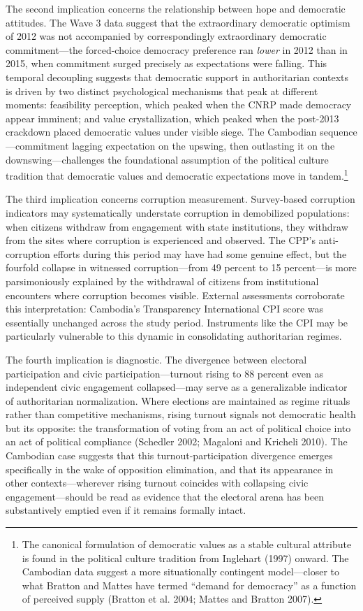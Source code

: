 \documentclass[Review,times,sageh,doublespace]{sagej}
\begin{document}
The second implication concerns the relationship between hope and
democratic attitudes. The Wave 3 data suggest that the extraordinary
democratic optimism of 2012 was not accompanied by correspondingly
extraordinary democratic commitment---the forced-choice democracy
preference ran \emph{lower} in 2012 than in 2015, when commitment surged
precisely as expectations were falling. This temporal decoupling
suggests that democratic support in authoritarian contexts is driven by
two distinct psychological mechanisms that peak at different moments:
feasibility perception, which peaked when the CNRP made democracy appear
imminent; and value crystallization, which peaked when the post-2013
crackdown placed democratic values under visible siege. The Cambodian
sequence---commitment lagging expectation on the upswing, then
outlasting it on the downswing---challenges the foundational assumption
of the political culture tradition that democratic values and democratic
expectations move in tandem.\footnote{The canonical formulation of
  democratic values as a stable cultural attribute is found in the
  political culture tradition from Inglehart (1997) onward. The
  Cambodian data suggest a more situationally contingent model---closer
  to what Bratton and Mattes have termed ``demand for democracy'' as a
  function of perceived supply (Bratton et al. 2004; Mattes and Bratton
  2007).}

The third implication concerns corruption measurement. Survey-based
corruption indicators may systematically understate corruption in
demobilized populations: when citizens withdraw from engagement with
state institutions, they withdraw from the sites where corruption is
experienced and observed. The CPP's anti-corruption efforts during this
period may have had some genuine effect, but the fourfold collapse in
witnessed corruption---from 49 percent to 15 percent---is more
parsimoniously explained by the withdrawal of citizens from
institutional encounters where corruption becomes visible. External
assessments corroborate this interpretation: Cambodia's Transparency
International CPI score was essentially unchanged across the study
period. Instruments like the CPI may be particularly vulnerable to this
dynamic in consolidating authoritarian regimes.

The fourth implication is diagnostic. The divergence between electoral
participation and civic participation---turnout rising to 88 percent
even as independent civic engagement collapsed---may serve as a
generalizable indicator of authoritarian normalization. Where elections
are maintained as regime rituals rather than competitive mechanisms,
rising turnout signals not democratic health but its opposite: the
transformation of voting from an act of political choice into an act of
political compliance (Schedler 2002; Magaloni and Kricheli 2010). The
Cambodian case suggests that this turnout-participation divergence
emerges specifically in the wake of opposition elimination, and that its
appearance in other contexts---wherever rising turnout coincides with
collapsing civic engagement---should be read as evidence that the
electoral arena has been substantively emptied even if it remains
formally intact.
\end{document}
